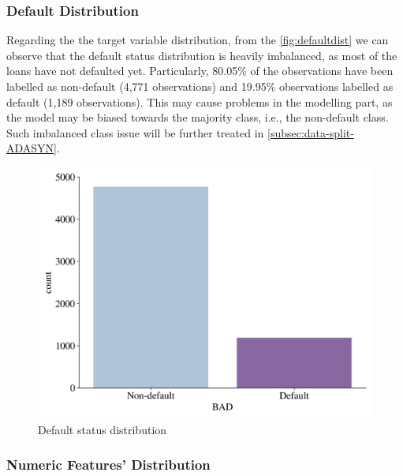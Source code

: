     \subsubsection{Default Distribution}

    Regarding the the target variable distribution, from the \autoref{fig:defaultdist} we can observe that the default status distribution is heavily imbalanced, as most of the loans have not defaulted yet.
    Particularly, 80.05\% of the observations have been labelled as non-default (4,771 observations) and 19.95\% observations labelled as default (1,189 observations).
    This may cause problems in the modelling part, as the model may be biased towards the majority class, i.e., the non-default class. Such imbalanced class issue will be further treated in \autoref{subsec:data-split-ADASYN}.

    \begin{figure}[H]
        \centering
        \caption{Default status distribution}
        \label{fig:defaultdist}
        \includegraphics[width=130mm]{Figures/Default_Distribution.jpg}\vspace{-1em}
    \vspace{-1em}
    \end{figure}

    \subsubsection{Numeric Features' Distribution}
    \label{subsubsec:numdist}

